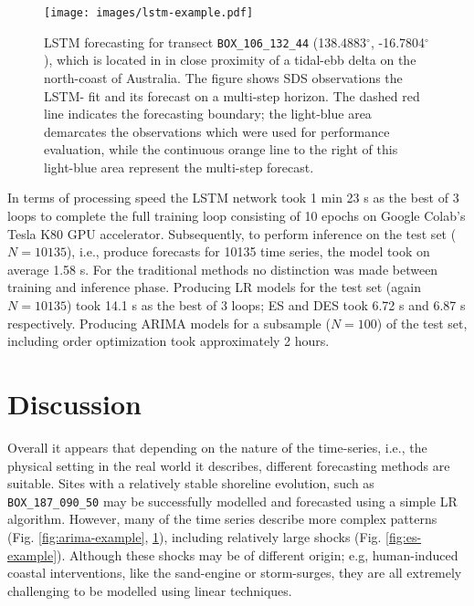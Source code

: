 \documentclass[format=sigconf, review=false, screen=true]{acmart}
\begin{document}
\begin{figure}[h]
	\centering
	\texttt{[image: images/lstm-example.pdf]}
	\caption{LSTM forecasting for transect \texttt{BOX\_106\_132\_44} (138.4883$^\circ$, -16.7804$^\circ$), which is located in in close proximity of a tidal-ebb delta on the north-coast of Australia. The figure shows SDS observations the LSTM- fit and its forecast on a multi-step horizon. The dashed red line indicates the forecasting boundary; the light-blue area demarcates the observations which were used for performance evaluation, while the continuous orange line to the right of this light-blue area represent the multi-step forecast.}
	\label{fig:lstm-example}
\end{figure}

In terms of processing speed the LSTM network took 1 min 23 s as the best of 3 loops to complete the full training loop consisting of 10 epochs on Google Colab's Tesla K80 GPU accelerator. Subsequently, to perform inference on the test set ($N=10135$), i.e., produce forecasts for 10135 time series, the model took on average 1.58 s. For the traditional methods no distinction was made between training and inference phase. Producing LR models for the test set (again $N=10135$) took 14.1 s as the best of 3 loops; ES and DES took 6.72 s and 6.87 s respectively. Producing ARIMA models for a subsample ($N=100$) of the test set, including order optimization took approximately 2 hours.

\section{Discussion}

Overall it appears that depending on the nature of the time-series, i.e., the physical setting in the real world it describes, different forecasting methods are suitable. Sites with a relatively stable shoreline evolution, such as \texttt{BOX\_187\_090\_50} may be successfully modelled and forecasted using a simple LR algorithm. However, many of the time series describe more complex patterns (Fig. \ref{fig:arima-example}, \ref{fig:lstm-example}), including relatively large shocks (Fig. \ref{fig:es-example}). Although these shocks may be of different origin; e.g, human-induced coastal interventions, like the sand-engine or storm-surges, they are all extremely challenging to be modelled using linear techniques. 
\end{document}
